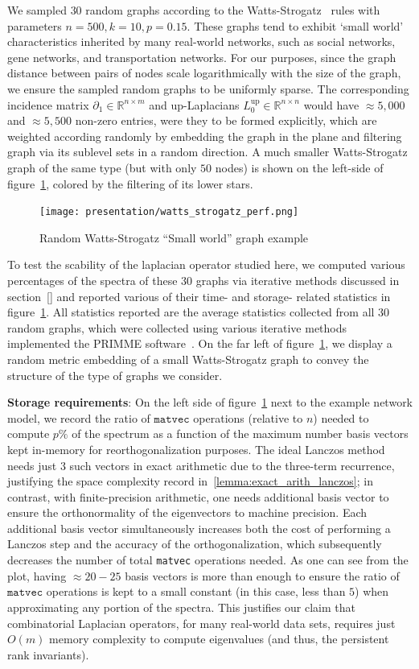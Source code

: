 \documentclass[10pt]{article}
\numberwithin{equation}{section}
\newcommand{\+}{%
	\raisebox{0.18ex}{\scaleobj{0.55}{+}}
}
\theoremstyle{definition}
\theoremstyle{definition}
\begin{document}
We sampled $30$ random graphs according to the Watts-Strogatz~\cite{} rules with parameters $n=500, k=10, p=0.15$. These graphs tend to exhibit `small world' characteristics inherited by many real-world networks, such as social networks, gene networks, and transportation networks.  
For our purposes, since the graph distance between pairs of nodes scale logarithmically with the size of the graph, we ensure the sampled random graphs to be uniformly sparse. 
The corresponding incidence matrix $\partial_1 \in \mathbb{R}^{n \times m}$ and up-Laplacians $L_0^{\mathrm{up}} \in \mathbb{R}^{n \times n}$ would have $\approx 5,000$ and  $\approx 5,500$ non-zero entries, were they to be formed explicitly, which are weighted according randomly by embedding the graph in the plane and filtering  graph via its sublevel sets in a random direction. 
A much smaller Watts-Strogatz graph of the same type (but with only $50$ nodes) is shown on the left-side of figure~\ref{fig:watts_strogatz}, colored by the filtering of its lower stars. 
\begin{figure}[ht]
	\texttt{[image: presentation/watts\_strogatz\_perf.png]}
	\caption{Random Watts-Strogatz ``Small world'' graph example}
	\label{fig:watts_strogatz}
\end{figure}
To test the scability of the laplacian operator studied here, we computed various percentages of the spectra of these $30$ graphs via iterative methods discussed in section~\ref{} and reported various of their time- and storage- related statistics in figure~\ref{fig:watts_strogatz}. 
All statistics reported are the average statistics collected from all 30 random graphs, which were collected using  various iterative methods implemented the PRIMME software~\cite{}. 
On the far left of figure~\ref{fig:watts_strogatz}, we display a random metric embedding of a small Watts-Strogatz graph to convey the structure of the type of graphs we consider. 

\textbf{Storage requirements}: On the left side of figure~\ref{fig:watts_strogatz} next to the example network model, we record the ratio of $\mathtt{matvec}$ operations (relative to $n$) needed to compute $p\%$ of the spectrum as a function of the maximum number basis vectors kept in-memory for reorthogonalization purposes. 
The ideal Lanczos method needs just $3$ such vectors in exact arithmetic due to the three-term recurrence, justifying the space complexity record in~\ref{lemma:exact_arith_lanczos}; in contrast, with finite-precision arithmetic, one needs additional basis vector to ensure the orthonormality of the eigenvectors to machine precision.
Each additional basis vector simultaneously increases both the cost of performing a Lanczos step and the accuracy of the orthogonalization, which subsequently decreases the number of total \texttt{matvec} operations needed. 
As one can see from the plot, having $\approx 20-25$ basis vectors is more than enough to ensure the ratio of $\mathtt{matvec}$ operations is kept to a small constant (in this case, less than $5$) when approximating any portion of the spectra. 
This justifies our claim that combinatorial Laplacian operators, for many real-world data sets, requires just $O(m)$ memory complexity to compute eigenvalues (and thus, the persistent rank invariants).
 
\end{document}

